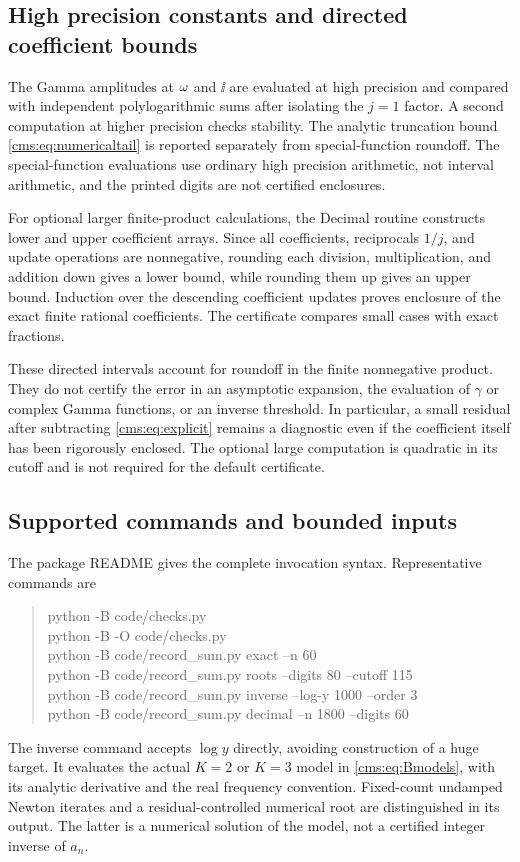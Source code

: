 \subsection{High precision constants and directed coefficient bounds}
The Gamma amplitudes at $\omega$ and $\ii$ are evaluated at high precision and compared with independent polylogarithmic sums after isolating the $j=1$ factor. A second computation at higher precision checks stability. The analytic truncation bound \eqref{cms:eq:numericaltail} is reported separately from special-function roundoff. The special-function evaluations use ordinary high precision arithmetic, not interval arithmetic, and the printed digits are not certified enclosures.

For optional larger finite-product calculations, the Decimal routine constructs lower and upper coefficient arrays. Since all coefficients, reciprocals $1/j$, and update operations are nonnegative, rounding each division, multiplication, and addition down gives a lower bound, while rounding them up gives an upper bound. Induction over the descending coefficient updates proves enclosure of the exact finite rational coefficients. The certificate compares small cases with exact fractions.

These directed intervals account for roundoff in the finite nonnegative product. They do not certify the error in an asymptotic expansion, the evaluation of $\gamma$ or complex Gamma functions, or an inverse threshold. In particular, a small residual after subtracting \eqref{cms:eq:explicit} remains a diagnostic even if the coefficient itself has been rigorously enclosed. The optional large computation is quadratic in its cutoff and is not required for the default certificate.

\subsection{Supported commands and bounded inputs}
The package README gives the complete invocation syntax. Representative commands are
\begin{quote}\small\ttfamily
python -B code/checks.py\\
python -B -O code/checks.py\\
python -B code/record\_sum.py exact --n 60\\
python -B code/record\_sum.py roots --digits 80 --cutoff 115\\
python -B code/record\_sum.py inverse --log-y 1000 --order 3\\
python -B code/record\_sum.py decimal --n 1800 --digits 60
\end{quote}
The inverse command accepts $\log y$ directly, avoiding construction of a huge target. It evaluates the actual $K=2$ or $K=3$ model in \eqref{cms:eq:Bmodels}, with its analytic derivative and the real frequency convention. Fixed-count undamped Newton iterates and a residual-controlled numerical root are distinguished in its output. The latter is a numerical solution of the model, not a certified integer inverse of $a_n$.

